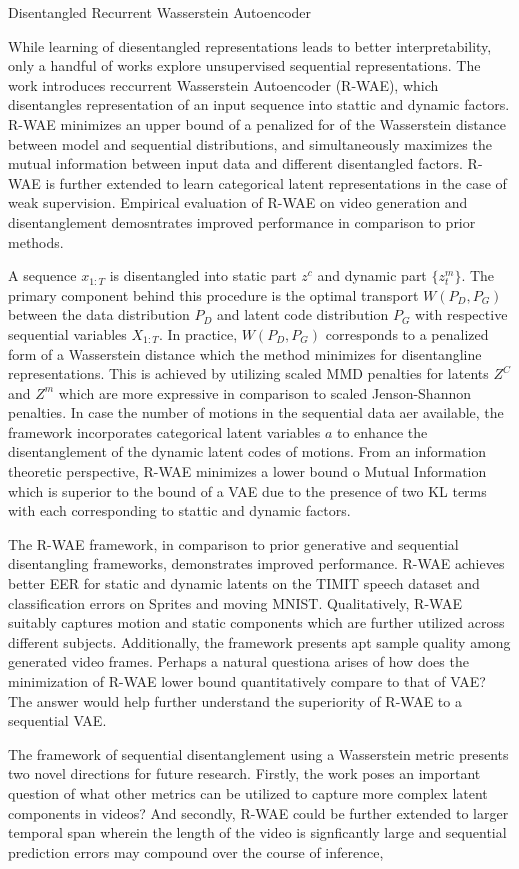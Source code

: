 \documentclass[11pt,letterpaper]{article}
\begin{document}
\begin{center}
  \large{Disentangled Recurrent Wasserstein Autoencoder}
\end{center}

While learning of diesentangled representations leads to better interpretability, only a handful of works explore unsupervised sequential representations. The work introduces reccurrent Wasserstein Autoencoder (R-WAE), which disentangles representation of an input sequence into stattic and dynamic factors. R-WAE minimizes an upper bound of a penalized for of the Wasserstein distance between model and sequential distributions, and simultaneously maximizes the mutual information between input data and different disentangled factors. R-WAE is further extended to learn categorical latent representations in the case of weak supervision. Empirical evaluation of R-WAE on video generation and disentanglement demosntrates improved performance in comparison to prior methods.

A sequence $x_{1:T}$ is disentangled into static part $z^{c}$ and dynamic part $\{z_{t}^{m}\}$. The primary component behind this procedure is the optimal transport $W(P_{D}, P_{G})$ between the data distribution $P_{D}$ and latent code distribution $P_{G}$ with respective sequential variables $X_{1:T}$. In practice, $W(P_{D},P_{G})$ corresponds to a penalized form of a Wasserstein distance which the method minimizes for disentangline representations. This is achieved by utilizing scaled MMD penalties for latents $Z^{C}$ and $Z^{m}$ which are more expressive in comparison to scaled Jenson-Shannon penalties. In case the number of motions in the sequential data aer available, the framework incorporates categorical latent variables $a$ to enhance the disentanglement of the dynamic latent codes of motions. From an information theoretic perspective, R-WAE minimizes a lower bound o Mutual Information which is superior to the bound of a VAE due to the presence of two KL terms with each corresponding to stattic and dynamic factors.

The R-WAE framework, in comparison to prior generative and sequential disentangling frameworks, demonstrates improved performance. R-WAE achieves better EER for static and dynamic latents on the TIMIT speech dataset and classification errors on Sprites and moving MNIST. Qualitatively, R-WAE suitably captures motion and static components which are further utilized across different subjects. Additionally, the framework presents apt sample quality among generated video frames. Perhaps a natural questiona arises of how does the minimization of R-WAE lower bound quantitatively compare to that of VAE? The answer would help further understand the superiority of R-WAE to a sequential VAE. 

The framework of sequential disentanglement using a Wasserstein metric presents two novel directions for future research. Firstly, the work poses an important question of what other metrics can be utilized to capture more complex latent components in videos? And secondly, R-WAE could be further extended to larger temporal span wherein the length of the video is signficantly large and sequential prediction errors may compound over the course of inference, 
\end{document}
